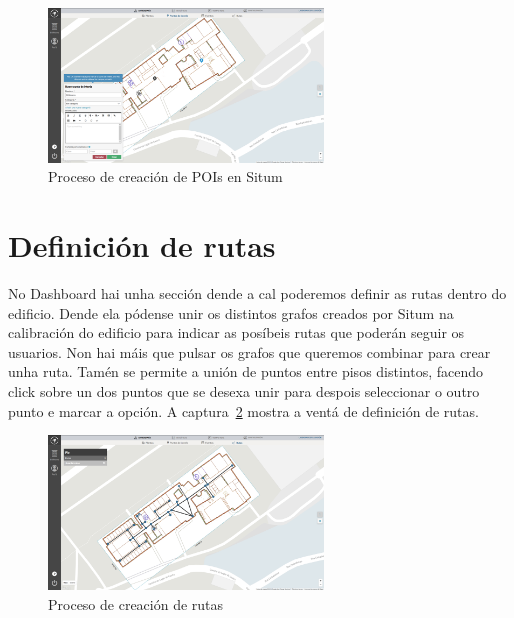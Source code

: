 \begin{figure}[tb] 
	\begin{center}
		\includegraphics[width=0.65\textwidth]{figures/Capturas/poi}
		\caption{Proceso de creación de POIs en Situm}
		\label{fig:poi}
	\end{center}
\end{figure}

\section{Definición de rutas}
No Dashboard hai unha sección dende a cal poderemos definir as rutas dentro do edificio. Dende ela pódense unir os distintos grafos creados por Situm na calibración do edificio para indicar as posíbeis rutas que poderán seguir os usuarios. Non hai máis que pulsar os grafos que queremos combinar para crear unha ruta. Tamén se permite a unión de puntos entre pisos distintos, facendo click sobre un dos puntos que se desexa unir para despois seleccionar o outro punto e marcar a opción. A captura~\ref{fig:rutas} mostra a ventá de definición de rutas.

\begin{figure}[tb] 
	\begin{center}
		\includegraphics[width=0.65\textwidth]{figures/Capturas/rutas}
		\caption{Proceso de creación de rutas}
		\label{fig:rutas}
	\end{center}
\end{figure}